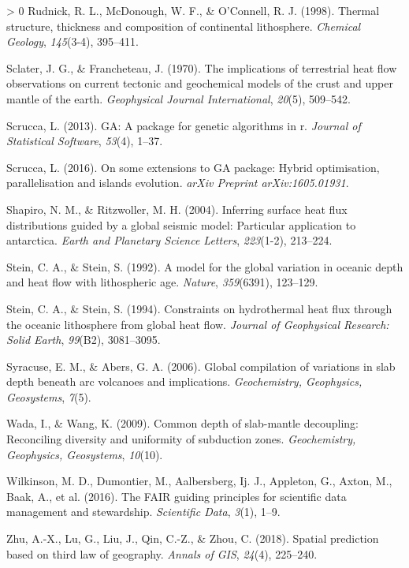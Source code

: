\documentclass[draft,linenumbers]{agujournal2018}
\newlength{\cslhangindent}
\newenvironment{CSLReferences}[3] %
 {%
  \setlength{\parindent}{0pt}
  \ifodd #1 \everypar{\setlength{\hangindent}{\cslhangindent}}\ignorespaces\fi
  \ifnum #2 > 0
  \setlength{\parskip}{#2\baselineskip}
  \fi
 }%
 {}
\begin{document}
\begin{CSLReferences}{1}{0}
\leavevmode\hypertarget{ref-rudnick1998}{}%
Rudnick, R. L., McDonough, W. F., \& O'Connell, R. J. (1998). Thermal
structure, thickness and composition of continental lithosphere.
\emph{Chemical Geology}, \emph{145}(3-4), 395--411.

\leavevmode\hypertarget{ref-sclater1970}{}%
Sclater, J. G., \& Francheteau, J. (1970). The implications of
terrestrial heat flow observations on current tectonic and geochemical
models of the crust and upper mantle of the earth. \emph{Geophysical
Journal International}, \emph{20}(5), 509--542.

\leavevmode\hypertarget{ref-scrucca2013}{}%
Scrucca, L. (2013). GA: A package for genetic algorithms in r.
\emph{Journal of Statistical Software}, \emph{53}(4), 1--37.

\leavevmode\hypertarget{ref-scrucca2016}{}%
Scrucca, L. (2016). On some extensions to GA package: Hybrid
optimisation, parallelisation and islands evolution. \emph{arXiv
Preprint arXiv:1605.01931}.

\leavevmode\hypertarget{ref-shapiro2004}{}%
Shapiro, N. M., \& Ritzwoller, M. H. (2004). Inferring surface heat flux
distributions guided by a global seismic model: Particular application
to antarctica. \emph{Earth and Planetary Science Letters},
\emph{223}(1-2), 213--224.

\leavevmode\hypertarget{ref-stein1992}{}%
Stein, C. A., \& Stein, S. (1992). A model for the global variation in
oceanic depth and heat flow with lithospheric age. \emph{Nature},
\emph{359}(6391), 123--129.

\leavevmode\hypertarget{ref-stein1994}{}%
Stein, C. A., \& Stein, S. (1994). Constraints on hydrothermal heat flux
through the oceanic lithosphere from global heat flow. \emph{Journal of
Geophysical Research: Solid Earth}, \emph{99}(B2), 3081--3095.

\leavevmode\hypertarget{ref-syracuse2006}{}%
Syracuse, E. M., \& Abers, G. A. (2006). Global compilation of
variations in slab depth beneath arc volcanoes and implications.
\emph{Geochemistry, Geophysics, Geosystems}, \emph{7}(5).

\leavevmode\hypertarget{ref-wada2009}{}%
Wada, I., \& Wang, K. (2009). Common depth of slab-mantle decoupling:
Reconciling diversity and uniformity of subduction zones.
\emph{Geochemistry, Geophysics, Geosystems}, \emph{10}(10).

\leavevmode\hypertarget{ref-wilkinson2016}{}%
Wilkinson, M. D., Dumontier, M., Aalbersberg, Ij. J., Appleton, G.,
Axton, M., Baak, A., et al. (2016). The FAIR guiding principles for
scientific data management and stewardship. \emph{Scientific Data},
\emph{3}(1), 1--9.

\leavevmode\hypertarget{ref-zhu2018}{}%
Zhu, A.-X., Lu, G., Liu, J., Qin, C.-Z., \& Zhou, C. (2018). Spatial
prediction based on third law of geography. \emph{Annals of GIS},
\emph{24}(4), 225--240.

\end{CSLReferences}


\end{document}
